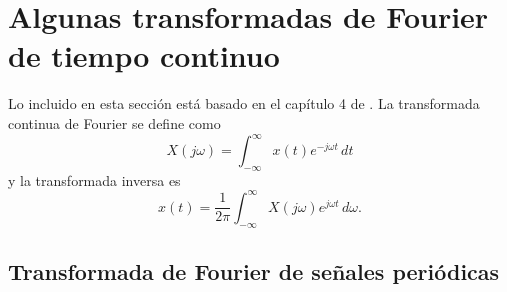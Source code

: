 \documentclass[a4paper]{report}
\begin{document}
 
 
 
 
 
 
 
 
 
 
 
 
 
 
 
 
 
 
 
 
 
 
 
 
 
 
 
 
 
 
 
 
 
 
 
 
 
 
 
 
 
 
 
 
 
 
 
 
 
 
 
 
 
 
 
 

 
\appendix 
 
\chapter{Algunas transformadas de Fourier de tiempo continuo}\label{ap:continous_fourier_transforms}

Lo incluido en esta sección está basado en el capítulo 4 de \cite{oppenheim1997signals}. La transformada continua de Fourier se define como
\begin{equation}\label{eq:continuous_fourier_transform_definition}
 X(j\omega) = \int_{-\infty}^{\infty}x(t)e^{-j\omega t}\,dt 
\end{equation}
y la transformada inversa es
\begin{equation}\label{eq:continuous_fourier_transform_definition_inverse}
 x(t)=\frac{1}{2\pi}\int_{-\infty}^{\infty}X(j\omega)e^{j\omega t}\,d\omega.
\end{equation}

\section{Transformada de Fourier de señales periódicas}
\end{document}

